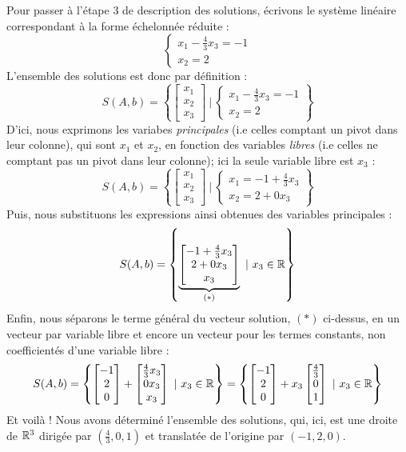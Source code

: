 Pour passer à l'étape 3 de description des solutions, écrivons le système linéaire correspondant à la forme échelonnée réduite :
$$
\begin{cases}
x_1 -\frac{4}{3}x_3 = -1\\
x_2 = 2
\end{cases}
$$
L'ensemble des solutions est donc par définition :
$$
S(A,b) = \left\{ \begin{bmatrix}
x_1 \\ x_2 \\ x_3
\end{bmatrix} \ | \ \begin{cases}
x_1 -\frac{4}{3}x_3 = -1\\
x_2 = 2
\end{cases}\right\}
$$
D'ici, nous exprimons les variabes \textit{principales} (i.e celles comptant un pivot dans leur colonne), qui sont $x_1$ et $x_2$, en fonction des variables \textit{libres} (i.e celles ne comptant pas un pivot dans leur colonne); ici la seule variable libre est $x_3$ :
$$
S(A,b) = \left\{ \begin{bmatrix}
x_1 \\ x_2 \\ x_3
\end{bmatrix} \ | \ \begin{cases}
x_1 = -1 +\frac{4}{3}x_3\\
x_2 = 2 + 0x_3
\end{cases}\right\}
$$
Puis, nous substituons les expressions ainsi obtenues des variables principales :
$$
S(A,b) = \left\{ \underbrace{\begin{bmatrix}
-1 +\frac{4}{3}x_3 \\ 2 + 0x_3 \\ x_3
\end{bmatrix}}_{(*)} \ | \ x_3 \in \mathbb{R}\right\}
$$
Enfin, nous séparons le terme général du vecteur solution, $(*)$ ci-dessus, en un vecteur par variable libre et encore un vecteur pour les termes constants, non coefficientés d'une variable libre :
$$
S(A,b) = \left\{ \begin{bmatrix}
-1 \\ 2 \\0
\end{bmatrix} + \begin{bmatrix}
\frac{4}{3}x_3\\ 0x_3 \\ x_3
\end{bmatrix} \ | \ x_3 \in \mathbb{R}\right\} = \left\{ \begin{bmatrix}
-1 \\ 2 \\0
\end{bmatrix} + x_3\begin{bmatrix}
\frac{4}{3}\\ 0 \\ 1
\end{bmatrix} \ | \ x_3 \in \mathbb{R}\right\}
$$
Et voilà ! Nous avons déterminé l'ensemble des solutions, qui, ici, est une droite de $\mathbb{R}^3$ dirigée par $(\frac{4}{3},0,1)$ et translatée de l'origine par $(-1,2,0)$. \\

